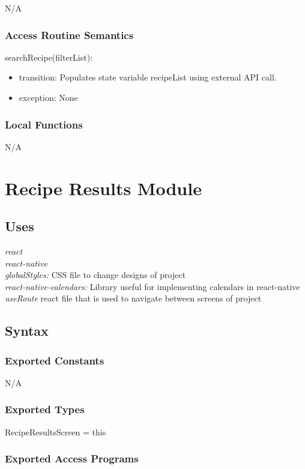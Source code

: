 \documentclass[12pt, titlepage]{article}
\begin{document}
N/A

\subsubsection{Access Routine Semantics}

\noindent searchRecipe(filterList):
\begin{itemize}
\item transition: Populates state variable recipeList using external API call.
\item exception: None 
\end{itemize}

\subsubsection{Local Functions}

N/A

\section{Recipe Results Module} \label{Module} 

\subsection{Uses}
{\textit{react}}\\
{\textit{react-native}}\\
{\textit{globalStyles:} CSS file to change designs of project}\\
{\textit{react-native-calendars:} Library useful for implementing calendars in react-native}\\
{\textit{useRoute} react file that is used to navigate between screens of project}\\
\subsection{Syntax}

\subsubsection{Exported Constants}
N/A

\subsubsection{Exported Types}
RecipeResultsScreen = this

\subsubsection{Exported Access Programs}
\end{document}
